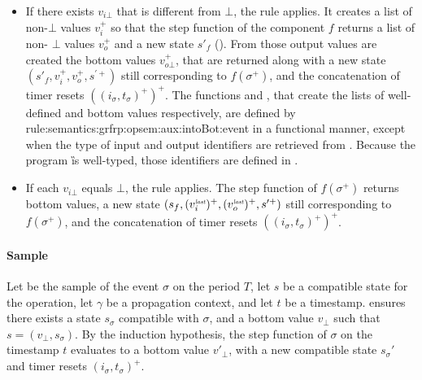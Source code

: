 \begin{skippableproof}
    \begin{itemize}
        \item If there exists $v_{i\bot}$ that is different from $\bot$, the rule  applies. It creates a list of non-$\bot$
              values $v_i^+$ so that the step function of the component $f$ returns a list of non-%
              $\bot$ values $v_o^+$ and a new state $s'_f$ ().
              From those output values are created the bottom values $v_{o\bot}^+$, that are
              returned along with a new state $(s'_f, v_i^+, v_o^+, s^{\prime+})$ still
              corresponding to $f(\sigma^+)$, and the concatenation of timer resets $((i_\sigma,
                  t_\sigma)^+)^+$. The functions  and , that create the lists of well-defined and bottom values
              respectively, are defined by 
              {rule:semantics:grfrp:opsem:aux:intoBot:event} in a functional manner, except when the
              type of input and output identifiers are retrieved from \tyCtx. Because the program
              \G is well-typed, those identifiers are defined in \tyCtx.

        \item If each $v_{i\bot}$ equals $\bot$, the rule  applies. The step function of $f(\sigma^+)$ returns bottom values, a
              new state $(s_f, (v_i^{\textit{\tiny last}})^+, (v_o^{\textit{\tiny last}})^+, s^{\prime+})$ still corresponding
              to $f(\sigma^+)$, and the concatenation of timer resets $((i_\sigma, t_\sigma)^+)^+$.
    \end{itemize}

    \paragraph{Sample}
    Let  be the sample of the event $\sigma$ on the period $T$, let $s$ be a
    compatible state for the operation, let $\gamma$ be a propagation context, and let $t$ be a
    timestamp.
     ensures there exists a state $s_\sigma$
    compatible with $\sigma$, and a bottom value $v_\bot$ such that $s = (v_\bot, s_\sigma)$.
    By the induction hypothesis, the step function of $\sigma$ on the timestamp $t$ evaluates to a
    bottom value $v'_\bot$, with a new compatible state $s_\sigma'$ and timer resets $(i_\sigma,
        t_\sigma)^+$.


\end{skippableproof}
